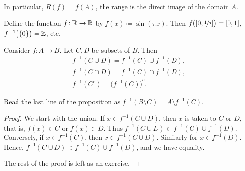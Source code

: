 In particular, $R(f) = f(A)$, the range is the direct image of
the domain $A$.

\begin{myfigureht}
\caption{Example of direct and inverse images for the function
$f \colon \{ 1,2,3,4 \} \to \{ a,b,c,d \}$ defined by
$f(1) \coloneqq b$,
$f(2) \coloneqq d$,
$f(3) \coloneqq c$,
$f(4) \coloneqq b$.\label{figfuncimags}}
\end{myfigureht}

\begin{example}
Define the function $f \colon {\mathbb{R}} \to {\mathbb{R}}$ by
$f(x) \coloneqq \sin(\pi x)$.  Then $f\bigl([0,\nicefrac{1}{2}]\bigr) = [0,1]$, 
$f^{-1}\bigl(\{0\}\bigr) = {\mathbb{Z}}$, etc.
\end{example}

\begin{prop} \label{st:propinv}
Consider $f \colon A \to B$.  Let $C, D$ be subsets of $B$.  Then
\begin{align*}
& f^{-1}( C \cup D) = f^{-1} (C) \cup f^{-1} (D) , \\
& f^{-1}( C \cap D) = f^{-1} (C) \cap f^{-1} (D) , \\
& f^{-1}( C^c) = {\bigl( f^{-1} (C) \bigr)}^c .
\end{align*}
\end{prop}

Read the last line of the proposition as
$f^{-1}( B \setminus C) = A \setminus f^{-1} (C)$.

\begin{proof}
We start with the union.  If $x \in 
f^{-1}( C \cup D)$, then 
$x$ is taken to $C$ or $D$, that is, $f(x) \in C$ or $f(x) \in D$.  Thus
$f^{-1}( C \cup D) \subset f^{-1} (C) \cup f^{-1} (D)$.  Conversely,
if $x \in f^{-1}(C)$, then $x \in f^{-1}(C \cup D)$.  Similarly for
$x \in f^{-1}(D)$.  Hence,
$f^{-1}( C \cup D) \supset f^{-1} (C) \cup f^{-1} (D)$, and we have
equality.

The rest of the proof is left as an exercise.
\end{proof}

